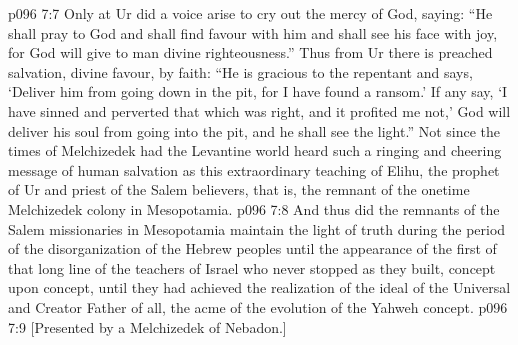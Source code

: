 \vs p096 7:7 Only at Ur did a voice arise to cry out the mercy of God, saying: “He shall pray to God and shall find favour with him and shall see his face with joy, for God will give to man divine righteousness.” Thus from Ur there is preached salvation, divine favour, by faith: “He is gracious to the repentant and says, ‘Deliver him from going down in the pit, for I have found a ransom.’ If any say, ‘I have sinned and perverted that which was right, and it profited me not,’ God will deliver his soul from going into the pit, and he shall see the light.” Not since the times of Melchizedek had the Levantine world heard such a ringing and cheering message of human salvation as this extraordinary teaching of Elihu, the prophet of Ur and priest of the Salem believers, that is, the remnant of the onetime Melchizedek colony in Mesopotamia.
\vs p096 7:8 And thus did the remnants of the Salem missionaries in Mesopotamia maintain the light of truth during the period of the disorganization of the Hebrew peoples until the appearance of the first of that long line of the teachers of Israel who never stopped as they built, concept upon concept, until they had achieved the realization of the ideal of the Universal and Creator Father of all, the acme of the evolution of the Yahweh concept.
\vsetoff
\vs p096 7:9 [Presented by a Melchizedek of Nebadon.]
\quizlink
